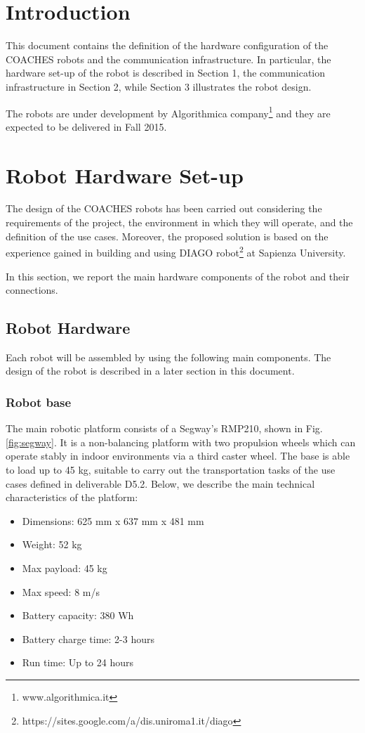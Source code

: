 \section*{Introduction}

This document contains the definition of the hardware configuration of the COACHES robots and the communication infrastructure. In particular, the hardware set-up of the robot is described in Section 1, the communication infrastructure in Section 2, while Section 3 illustrates the robot design.

The robots are under development by Algorithmica company\footnote{www.algorithmica.it} and they are expected to be delivered in Fall 2015.


\section{Robot Hardware Set-up}

The design of the COACHES robots has been carried out considering the requirements of the project, the environment in which they will operate, and the definition of the use cases.
Moreover, the proposed solution is based on the experience gained in building and using DIAGO robot\footnote{https://sites.google.com/a/dis.uniroma1.it/diago} at Sapienza University.

In this section, we report the main hardware components of the robot and their connections.


\subsection{Robot Hardware}

Each robot will be assembled by using the following main components.
The design of the robot is described in a later section in this document.


\subsubsection{Robot base}
The main robotic platform consists of a Segway's RMP210, shown in Fig. \ref{fig:segway}.
It is a non-balancing platform with two propulsion wheels which can operate stably in indoor environments via a third caster wheel. The base is able to load up to 45 kg, suitable to carry out the transportation tasks of the use cases defined in deliverable D5.2. Below, we describe the main technical characteristics of the platform:
\begin{itemize}
\item Dimensions: 625 mm x 637 mm x 481 mm
\item Weight: 52 kg
\item Max payload: 45 kg
\item Max speed: 8 m/s
\item Battery capacity: 380 Wh
\item Battery charge time: 2-3 hours
\item Run time: Up to 24 hours
\end{itemize}

